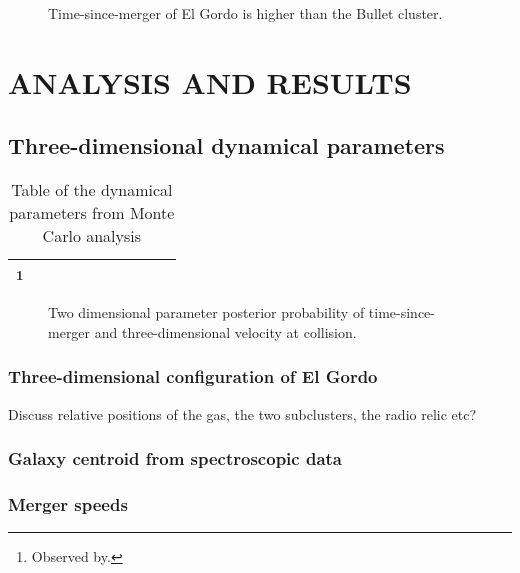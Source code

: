\documentclass[useAMS,usenatbib]{mn2e}
\begin{document}
\begin{figure}
 \vspace{302pt}
 \caption{Time-since-merger of El Gordo is higher than the Bullet cluster.}
\end{figure}

\section{ANALYSIS AND RESULTS}
\subsection{Three-dimensional dynamical parameters}
\begin{table*}[!h]
 \centering
 \begin{minipage}{140mm}
  \caption{Table of the dynamical parameters from Monte Carlo analysis}
  \begin{tabular}{@{}llrrrrlrlr@{}}
  \hline
  \footnote{Observed by.}\\
\hline
\end{tabular}
\end{minipage}
\end{table*}


\begin{figure*}
  \vspace*{174pt}
  \caption{Two dimensional parameter posterior probability of time-since-merger and three-dimensional velocity at collision.}
\end{figure*}



\subsubsection{Three-dimensional configuration of El Gordo}

Discuss relative positions of the gas, the two subclusters, the radio relic etc?

\subsubsection{Galaxy centroid from spectroscopic data}

\subsubsection{Merger speeds} 
\end{document}
